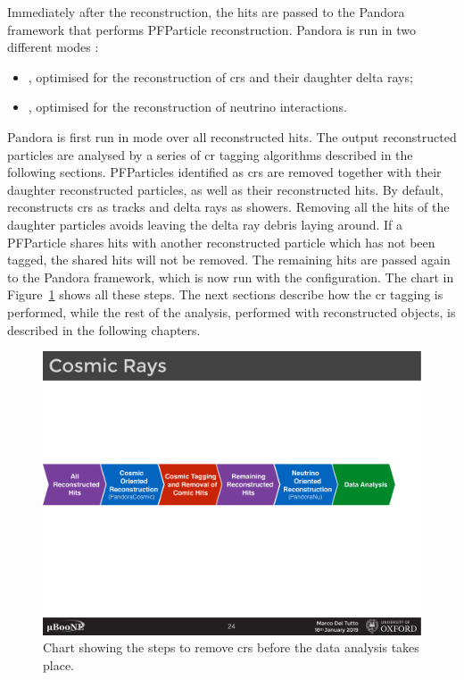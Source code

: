 Immediately after the reconstruction, the hits are passed to the Pandora framework that performs PFParticle reconstruction. Pandora is run in two different modes \cite{pandora}:
\begin{itemize}
\item \pc, optimised for the reconstruction of \acrshort{cr}s and their daughter delta rays;
\item \pn, optimised for the reconstruction of neutrino interactions. 
\end{itemize}
Pandora is first run in \pc mode over all reconstructed hits. The output reconstructed particles are analysed by a series of \acrshort{cr} tagging algorithms described in the following sections. PFParticles identified as \acrshort{cr}s are removed together with their daughter reconstructed particles, as well as their reconstructed hits. By default, \pc reconstructs \acrshort{cr}s as tracks and delta rays as showers. Removing all the hits of the daughter particles avoids leaving the delta ray debris laying around. If a PFParticle shares hits with another reconstructed particle which has not been tagged, the shared hits will not be removed. 
The remaining hits are passed again to the Pandora framework, which is now run with the \pn configuration. The chart in Figure~\ref{fig:cosmic_removal_chart} shows all these steps. The next sections describe how the \acrshort{cr} tagging is performed, while the rest of the analysis, performed with \pn reconstructed objects, is described in the following chapters. 

\begin{figure}[]
\centering
\includegraphics[width=1.0\textwidth]{images/Reconstruction/cosmic_removal_chart}
\caption[Cosmic Tagging Chart]{Chart showing the steps to remove \acrshort{cr}s before the data analysis takes place.}
\label{fig:cosmic_removal_chart}
\end{figure}



